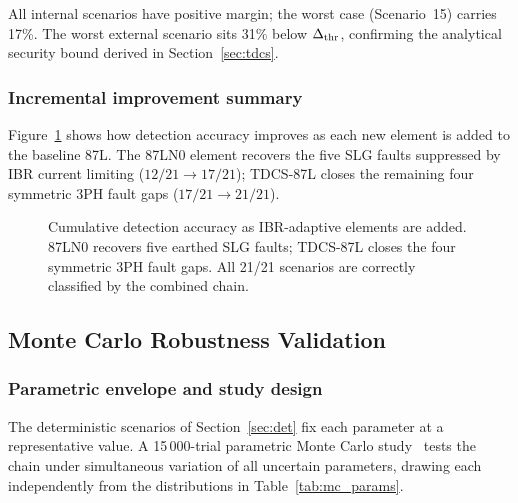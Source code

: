 \documentclass[journal,twoside,10pt]{IEEEtran}
\begin{document}
All internal scenarios have positive margin; the worst case (Scenario~15)
carries 17\%.  The worst external scenario sits 31\% below
$\Delta_{\rm thr}$, confirming the analytical security bound derived in
Section~\ref{sec:tdcs}.

\subsubsection{Incremental improvement summary}

Figure~\ref{fig:improvement} shows how detection accuracy improves as
each new element is added to the baseline 87L.  The 87LN0 element recovers
the five SLG faults suppressed by IBR current limiting
($12/21 \to 17/21$); TDCS-87L closes the remaining four symmetric 3PH
fault gaps ($17/21 \to 21/21$).

\begin{figure}[!t]
  \centering
  
  \caption{Cumulative detection accuracy as IBR-adaptive elements are added.
           87LN0 recovers five earthed SLG faults; TDCS-87L closes the
           four symmetric 3PH fault gaps.  All 21/21 scenarios are
           correctly classified by the combined chain.}
  \label{fig:improvement}
\end{figure}

\subsection{Monte Carlo Robustness Validation}
\label{sec:montecarlo}

\subsubsection{Parametric envelope and study design}

The deterministic scenarios of Section~\ref{sec:det} fix each parameter
at a representative value.  A 15\,000-trial parametric Monte Carlo
study~\cite{SAMBP_TR26} tests the chain under simultaneous variation of
all uncertain parameters, drawing each independently from the distributions
in Table~\ref{tab:mc_params}.
\end{document}
